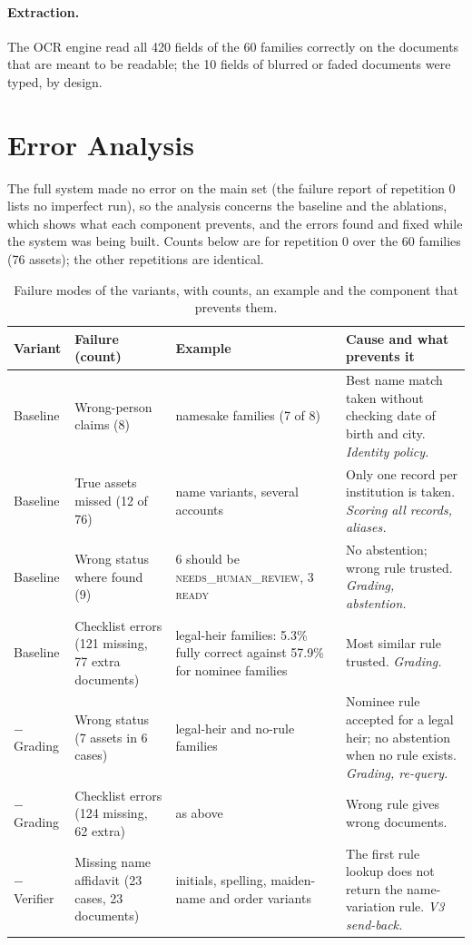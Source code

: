 \paragraph{Extraction.} The OCR engine read all 420 fields of the 60 families correctly on the documents that are meant to be readable; the 10 fields of blurred or faded documents were typed, by design.

\section{Error Analysis}
The full system made no error on the main set (the failure report of repetition 0 lists no imperfect run), so the analysis concerns the baseline and the ablations, which shows what each component prevents, and the errors found and fixed while the system was being built. Counts below are for repetition 0 over the 60 families (76 assets); the other repetitions are identical.

\begin{table}[H]
\centering\footnotesize{}
\caption[Failure modes of the variants]{Failure modes of the variants, with counts, an example and the component that prevents them.}\label{tab:errors}
\renewcommand{\arraystretch}{1.1}
\begin{tabularx}{\linewidth}{@{}p{1.7cm}p{3.1cm}p{3.6cm}X@{}}
\toprule
\textbf{Variant} & \textbf{Failure (count)} & \textbf{Example} & \textbf{Cause and what prevents it} \\ \midrule
Baseline & Wrong-person claims (8) & namesake families (7 of 8) & Best name match taken without checking date of birth and city. \emph{Identity policy.} \\
Baseline & True assets missed (12 of 76) & name variants, several accounts & Only one record per institution is taken. \emph{Scoring all records, aliases.} \\
Baseline & Wrong status where found (9) & 6 should be \textsc{needs\_human\_review}, 3 \textsc{ready} & No abstention; wrong rule trusted. \emph{Grading, abstention.} \\
Baseline & Checklist errors (121 missing, 77 extra documents) & legal-heir families: 5.3\% fully correct against 57.9\% for nominee families & Most similar rule trusted. \emph{Grading.} \\
$-$Grading & Wrong status (7 assets in 6 cases) & legal-heir and no-rule families & Nominee rule accepted for a legal heir; no abstention when no rule exists. \emph{Grading, re-query.} \\
$-$Grading & Checklist errors (124 missing, 62 extra) & as above & Wrong rule gives wrong documents. \\
$-$Verifier & Missing name affidavit (23 cases, 23 documents) & initials, spelling, maiden-name and order variants & The first rule lookup does not return the name-variation rule. \emph{V3 send-back.} \\ \bottomrule
\end{tabularx}
\end{table}

